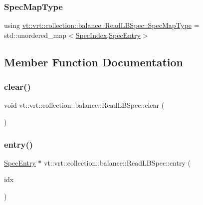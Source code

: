 \subsubsection{\texorpdfstring{Spec\+Map\+Type}{SpecMapType}}
{\footnotesize\ttfamily using \hyperlink{structvt_1_1vrt_1_1collection_1_1balance_1_1_read_l_b_spec_a6b1c83bd61c581d9605941e2381432b9}{vt\+::vrt\+::collection\+::balance\+::\+Read\+L\+B\+Spec\+::\+Spec\+Map\+Type} =  std\+::unordered\+\_\+map$<$\hyperlink{namespacevt_1_1vrt_1_1collection_1_1balance_a72a5e0d9936ddf57f8e6c64e0e9fd123}{Spec\+Index},\hyperlink{structvt_1_1vrt_1_1collection_1_1balance_1_1_spec_entry}{Spec\+Entry}$>$}



\subsection{Member Function Documentation}
\mbox{\label{structvt_1_1vrt_1_1collection_1_1balance_1_1_read_l_b_spec_aa92db6434f6eb0839312f914139d296c}} 
\subsubsection{\texorpdfstring{clear()}{clear()}}
{\footnotesize\ttfamily void vt\+::vrt\+::collection\+::balance\+::\+Read\+L\+B\+Spec\+::clear (\begin{DoxyParamCaption}{ }\end{DoxyParamCaption})\hspace{0.3cm}{\ttfamily [static]}}

\mbox{\label{structvt_1_1vrt_1_1collection_1_1balance_1_1_read_l_b_spec_af9e1e7f7ea03e6a7bc06d38c2ca28544}} 
\subsubsection{\texorpdfstring{entry()}{entry()}}
{\footnotesize\ttfamily \hyperlink{structvt_1_1vrt_1_1collection_1_1balance_1_1_spec_entry}{Spec\+Entry} $\ast$ vt\+::vrt\+::collection\+::balance\+::\+Read\+L\+B\+Spec\+::entry (\begin{DoxyParamCaption}\item[{\hyperlink{namespacevt_1_1vrt_1_1collection_1_1balance_a72a5e0d9936ddf57f8e6c64e0e9fd123}{Spec\+Index} const \&}]{idx }\end{DoxyParamCaption})\hspace{0.3cm}{\ttfamily [static]}}

